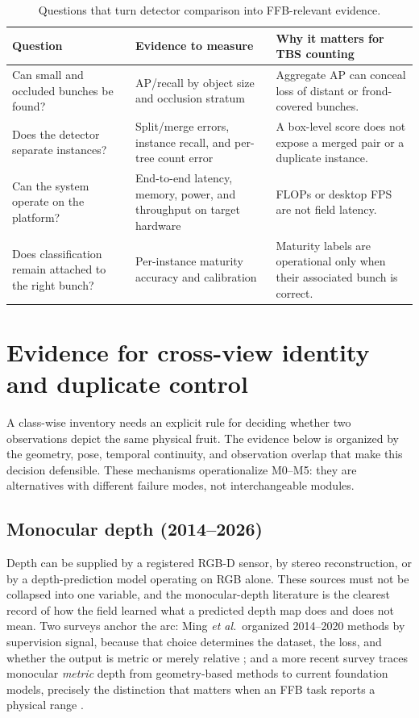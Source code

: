 \begin{table}[t]
\centering\small
\caption{Questions that turn detector comparison into FFB-relevant evidence.}
\label{tab:baseline}
\begin{tabular}{p{}p{}p{}}
\toprule
Question & Evidence to measure & Why it matters for TBS counting \\
\midrule
Can small and occluded bunches be found? & AP/recall by object size and occlusion stratum & Aggregate AP can conceal loss of distant or frond-covered bunches. \\
Does the detector separate instances? & Split/merge errors, instance recall, and per-tree count error & A box-level score does not expose a merged pair or a duplicate instance. \\
Can the system operate on the platform? & End-to-end latency, memory, power, and throughput on target hardware & FLOPs or desktop FPS are not field latency. \\
Does classification remain attached to the right bunch? & Per-instance maturity accuracy and calibration & Maturity labels are operational only when their associated bunch is correct. \\
\bottomrule
\end{tabular}
\end{table}



\section{Evidence for cross-view identity and duplicate control}

A class-wise inventory needs an explicit rule for deciding whether two observations depict the same physical fruit. The evidence below is organized by the geometry, pose, temporal continuity, and observation overlap that make this decision defensible. These mechanisms operationalize M0--M5: they are alternatives with different failure modes, not interchangeable modules.

\subsection{Monocular depth (2014--2026)}

Depth can be supplied by a registered RGB-D sensor, by stereo reconstruction, or by a depth-prediction model operating on RGB alone. These sources must not be collapsed into one variable, and the monocular-depth literature is the clearest record of how the field learned what a predicted depth map does and does not mean. Two surveys anchor the arc: Ming \textit{et al.}\ organized 2014--2020 methods by supervision signal, because that choice determines the dataset, the loss, and whether the output is metric or merely relative \cite{ming2021depthsurvey}; and a more recent survey traces monocular \emph{metric} depth from geometry-based methods to current foundation models, precisely the distinction that matters when an FFB task reports a physical range \cite{zhang2025metricdepthsurvey}.

